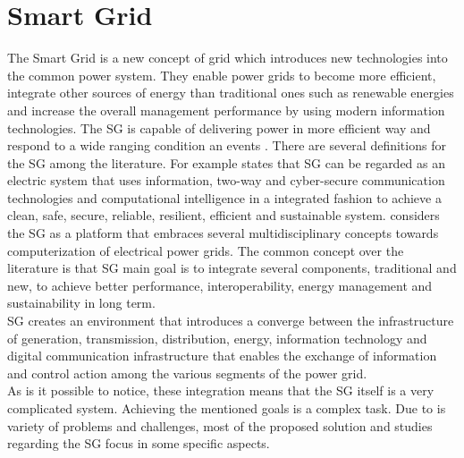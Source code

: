 \chapter{Smart Grid}\label{chap:sg}
The Smart Grid  is a new concept of grid which introduces new technologies into the common power system. They enable power grids to become more efficient, integrate other sources of energy than traditional ones such as renewable energies and increase the overall management performance by using modern information technologies. The SG is capable of delivering power in more efficient way and respond to a wide ranging condition an events \cite{journals/comsur/FangMXY12}.
There are several definitions for the SG among the literature. For example \cite{journals/comsur/FangMXY12} states that SG can be regarded as an electric system that uses information, two-way and cyber-secure communication technologies and computational intelligence in a integrated fashion to achieve a clean, safe, secure, reliable, resilient, efficient and sustainable system.\cite{conf/isgt/GhoshPR13} considers the SG as a platform that embraces several multidisciplinary concepts towards computerization of electrical power grids. The common concept over the literature is that SG main goal is to integrate several components, traditional and new, to achieve better performance, interoperability, energy management and sustainability in long term. \\
SG creates an environment that introduces a converge between the infrastructure of generation, transmission, distribution, energy, information technology and digital communication infrastructure that enables the exchange of information and control action among the various segments of the power grid.\\
As is it possible to notice, these integration means that the SG itself is a very complicated system. Achieving the mentioned goals is a complex task. Due to is variety of problems and challenges, most of the proposed solution and studies regarding the SG focus in some specific aspects. 
